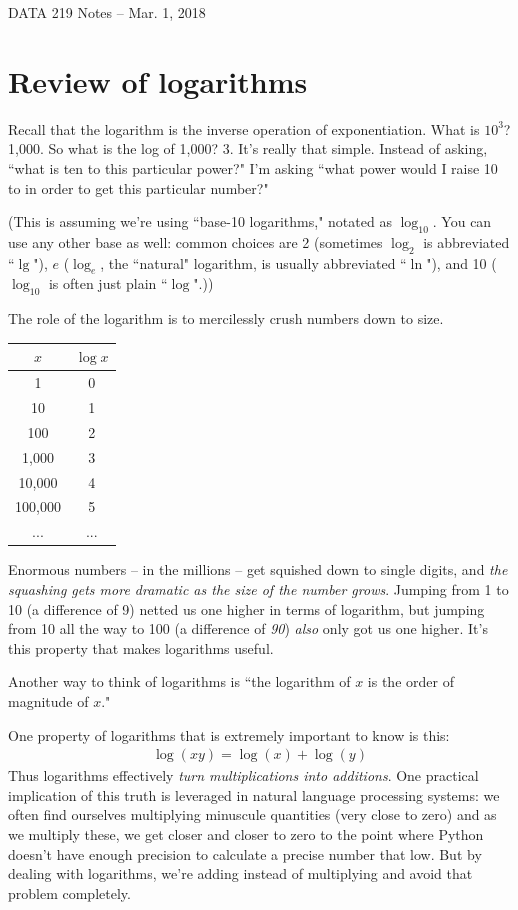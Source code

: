\documentclass[12pt]{article}
\begin{document}
\begin{center}
\begin{Large}
DATA 219 Notes -- Mar. 1, 2018
\end{Large}
\end{center}

\section{Review of logarithms}

Recall that the logarithm is the inverse operation of exponentiation. What is
$10^3$? 1,000. So what is the log of 1,000? 3. It's really that simple.
Instead of asking, ``what is ten to this particular power?" I'm asking ``what
power would I raise 10 to in order to get this particular number?"

(This is assuming we're using ``base-10 logarithms," notated as
$\log_{10}$. You can use any other base as well: common choices are 
2 (sometimes $\log_{2}$ is abbreviated ``$\lg$"),
$e$ ($\log_{e}$, the ``natural" logarithm, is usually abbreviated ``$\ln$"),
and 10 ($\log_{10}$ is often just plain ``$\log$".))

The role of the logarithm is to mercilessly crush numbers down to size.

\begin{center}
\begin{tabular}{c|c}
$x$ & $\log x$ \\
\hline
1 & 0 \\
10 & 1 \\
100 & 2 \\
1,000 & 3 \\
10,000 & 4 \\
100,000 & 5 \\
... & ... \\
\end{tabular}
\end{center}

Enormous numbers -- in the millions -- get squished down to single digits, and
\textit{the squashing gets more dramatic as the size of the number grows}.
Jumping from 1 to 10 (a difference of 9) netted us one higher in terms of
logarithm, but jumping from 10 all the way to 100 (a difference of
\textit{90}) \textit{also} only got us one higher. It's this property that
makes logarithms useful.

Another way to think of logarithms is ``the logarithm of $x$ is the order of
magnitude of $x$."

One property of logarithms that is extremely important to know is this:
\begin{align*}
\log(xy) = \log(x) + \log(y)
\end{align*}
Thus logarithms effectively \textit{turn multiplications into additions}. One
practical implication of this truth is leveraged in natural language
processing systems: we often find ourselves multiplying minuscule quantities
(very close to zero) and as we multiply these, we get closer and closer to
zero to the point where Python doesn't have enough precision to calculate a
precise number that low. But by dealing with logarithms, we're adding instead
of multiplying and avoid that problem completely.
\end{document}
